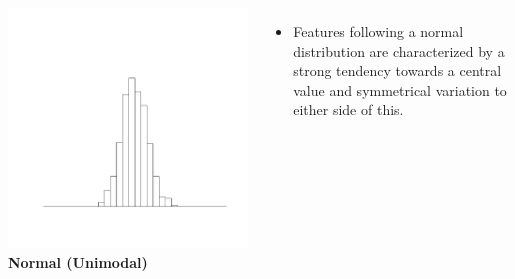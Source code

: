 \documentclass[xcolor={table}]{beamer}
\begin{document}
\begin{frame} 
	\begin{columns}[t]
		 
			\centering
			\includegraphics[width=1.0\textwidth]{./images/HistogramShapes_unimodal.pdf}\\
			\tiny \textbf{Normal (Unimodal)}

		\begin{itemize}
			\item Features following a normal distribution are characterized by a strong tendency towards a central value and symmetrical variation to either side of this. 
		\end{itemize}
	\end{columns}
\end{frame} 
\end{document}
